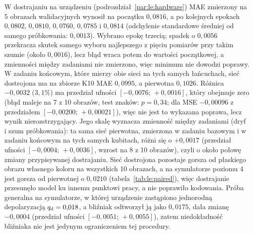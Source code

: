 W dostrajaniu na urządzeniu (podrozdział~\ref{par:le:hardware}) MAE zmierzony na 5 obrazach walidacyjnych wynosił na początku $0{,}0816$, a po kolejnych epokach $0{,}0802$, $0{,}0810$, $0{,}0760$, $0{,}0785$ i $0{,}0814$ (odchylenie standardowe średniej od samego próbkowania: $0{,}0013$).
Wybrano epokę trzecią; spadek o $0{,}0056$ przekracza skutek samego wyboru najlepszego z pięciu pomiarów przy takim szumie (około $0{,}0016$), lecz błąd wraca potem do wartości początkowej, a zmienności między zadaniami nie zmierzono, więc minimum nie dowodzi poprawy.
W zadaniu końcowym, które mierzy obie sieci na tych samych łańcuchach, sieć dostrojona ma na zbiorze K10 MAE $0{,}0995$, a pierwotna $0{,}1026$.
Różnica $-0{,}0032$ ($3{,}1\%$) ma przedział ufności $[-0{,}0076;\,+0{,}0016]$, który obejmuje zero (błąd maleje na 7 z 10 obrazów, test znaków: $p=0{,}34$; dla MSE $-0{,}00096$ z przedziałem $[-0{,}00200;\,+0{,}00021]$), więc nie jest to wykazana poprawa, lecz wynik nierozstrzygający.
Jego skalę wyznacza zmienność między zadaniami (dryf i szum próbkowania): ta sama sieć pierwotna, zmierzona w zadaniu bazowym i w zadaniu końcowym na tych samych kubitach, różni się o $+0{,}0017$ (przedział ufności $[-0{,}0004;\,+0{,}0036]$, wzrost na 8 z 10 obrazów), czyli o około połowę zmiany przypisywanej dostrajaniu.
Sieć dostrojona pozostaje gorsza od płaskiego obrazu własnego koloru na wszystkich 10 obrazach, a na symulatorze poziomu 4 jest gorsza od pierwotnej o $0{,}0210$ (tabela~\ref{tab:le:paired}), więc dostrajanie przesunęło model ku innemu punktowi pracy, a nie poprawiło kodowania.
Próba generalna na symulatorze, w której urządzenie zastąpiono jednorodną depolaryzacją $q_{\mathrm{d}}=0{,}018$, a bliźniak odtworzył ją jako $0{,}0175$, dała zmianę $-0{,}0004$ (przedział ufności $[-0{,}0051;\,+0{,}0055]$), zatem niedokładność bliźniaka nie jest jedynym ograniczeniem tej procedury.
